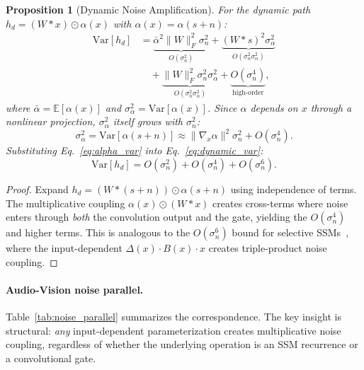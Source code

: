 \documentclass[10pt,twocolumn,letterpaper]{article}
\newtheorem{proposition}{Proposition}
\begin{document}
\begin{proposition}[Dynamic Noise Amplification]
\label{prop:dynamic}
For the dynamic path $h_d = (W * x) \odot \alpha(x)$ with $\alpha(x) = \alpha(s + n)$:
\begin{align}
\text{Var}[h_d] &= \underbrace{\bar{\alpha}^2 \|W\|_F^2 \sigma_n^2}_{O(\sigma_n^2)} + \underbrace{(W*s)^2 \sigma_\alpha^2}_{O(\sigma_n^2 \sigma_\alpha^2)} \nonumber \\
&\quad + \underbrace{\|W\|_F^2 \sigma_n^2 \sigma_\alpha^2}_{O(\sigma_n^2 \sigma_\alpha^2)} + \underbrace{O(\sigma_n^4)}_{\text{high-order}},
\label{eq:dynamic_var}
\end{align}
where $\bar{\alpha} = \mathbb{E}[\alpha(x)]$ and $\sigma_\alpha^2 = \text{Var}[\alpha(x)]$.
Since $\alpha$ depends on $x$ through a nonlinear projection, $\sigma_\alpha^2$ itself grows with $\sigma_n^2$:
\begin{equation}
\sigma_\alpha^2 = \text{Var}[\alpha(s+n)] \approx \|\nabla_x \alpha\|^2 \sigma_n^2 + O(\sigma_n^4).
\label{eq:alpha_var}
\end{equation}
Substituting Eq.~\ref{eq:alpha_var} into Eq.~\ref{eq:dynamic_var}:
\begin{equation}
\text{Var}[h_d] = O(\sigma_n^2) + O(\sigma_n^4) + O(\sigma_n^6).
\label{eq:dyn_total}
\end{equation}
\end{proposition}
\begin{proof}
Expand $h_d = (W * (s{+}n)) \odot \alpha(s{+}n)$ using independence of terms.
The multiplicative coupling $\alpha(x) \odot (W{*}x)$ creates cross-terms where noise enters through \emph{both} the convolution output and the gate, yielding the $O(\sigma_n^4)$ and higher terms.
This is analogous to the $O(\sigma_n^6)$ bound for selective SSMs~\cite{choi2026ncssm}, where the input-dependent $\Delta(x) \cdot B(x) \cdot x$ creates triple-product noise coupling.
\end{proof}

\paragraph{Audio-Vision noise parallel.}
Table~\ref{tab:noise_parallel} summarizes the correspondence.
The key insight is structural: \emph{any} input-dependent parameterization creates multiplicative noise coupling, regardless of whether the underlying operation is an SSM recurrence or a convolutional gate.
\end{document}
